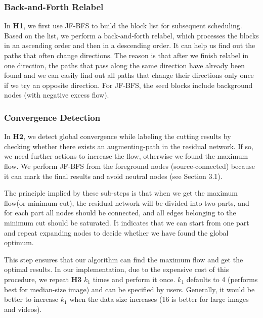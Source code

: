 \subsubsection{Back-and-Forth Relabel}

In \textbf{H1}, we first use JF-BFS to build the block list for subsequent scheduling.
Based on the list, we perform a back-and-forth relabel, which processes the blocks in an ascending order and then in a descending order.
It can help us find out the paths that often change directions.
The reason is that after we finish relabel in one direction, the paths that pass along the same direction have already been found and we can easily find out all paths that change their directions only once if we try an opposite direction.
For JF-BFS, the seed blocks include background nodes (with negative excess flow).

\subsubsection{Convergence Detection}

In \textbf{H2}, we detect global convergence while labeling the cutting results by checking whether there exists an augmenting-path in the residual network.
If so, we need further actions to increase the flow, otherwise we found the maximum flow.
We perform JF-BFS from the foreground nodes (source-connected) because it can mark the final results and avoid neutral nodes (see Section 3.1).

The principle implied by these sub-steps is that when we get the maximum flow(or minimum cut), the residual network will be divided into two parts, and for each part all nodes should be connected, and all edges belonging to the minimum cut should be saturated.
It indicates that we can start from one part and repeat expanding nodes to decide whether we have found the global optimum.

This step ensures that our algorithm can find the maximum flow and get the optimal results.
In our implementation, due to the expensive cost of this procedure, we repeat \textbf{H3} $k_1$ times and perform it once.
$k_1$ defaults to 4 (performs best for median-size image) and can be specified by users.
Generally, it would be better to increase $k_1$ when the data size increases (16 is better for large images and videos).

